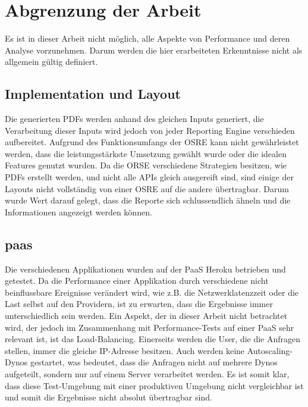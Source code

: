 \documentclass[main.tex]{subfiles}
\begin{document}
\section{Abgrenzung der Arbeit}

Es ist in dieser Arbeit nicht möglich, alle Aspekte von Performance und deren Analyse vorzunehmen. Darum werden die hier erarbeiteten Erkenntnisse nicht als allgemein gültig definiert. 

\subsection{Implementation und Layout} 
Die generierten PDFs werden anhand des gleichen Inputs generiert, die Verarbeitung dieser Inputs wird jedoch von jeder Reporting Engine verschieden aufbereitet. Aufgrund des Funktionsumfangs der OSRE kann nicht gewährleistet werden, dass die leistungsstärkste Umsetzung gewählt wurde oder die idealen Features genutzt wurden. Da die ORSE verschiedene Strategien besitzen, wie PDFs erstellt werden, und nicht alle APIs gleich ausgereift sind, sind einige der Layouts nicht vollständig von einer OSRE auf die andere übertragbar. Darum wurde Wert darauf gelegt, dass die Reporte sich schlussendlich ähneln und die Informationen angezeigt werden können.

\subsection{\acrlong{paas}}
Die verschiedenen Applikationen wurden auf der PaaS Heroku betrieben und getestet. Da die Performance einer Applikation durch verschiedene nicht beinflussbare Ereignisse verändert wird, wie z.B. die Netzwerklatenzzeit oder die Last selbst auf den Providern, ist zu erwarten, dass die Ergebnisse immer unterschiedlich sein werden. 
Ein Aspekt, der in dieser Arbeit nicht betrachtet wird, der jedoch im Zusammenhang mit Performance-Tests auf einer PaaS sehr relevant ist, ist das Load-Balancing. Einerseits werden die User, die die Anfragen stellen, immer die gleiche IP-Adresse besitzen. Auch werden keine Autoscaling-Dynos gestartet, was bedeutet, dass die Anfragen nicht auf mehrere Dynos aufgeteilt, sondern nur auf einem Server verarbeitet werden. Es ist somit klar, dass diese Test-Umgebung mit einer produktiven Umgebung nicht vergleichbar ist und somit die Ergebnisse nicht absolut übertragbar sind.
\end{document}
